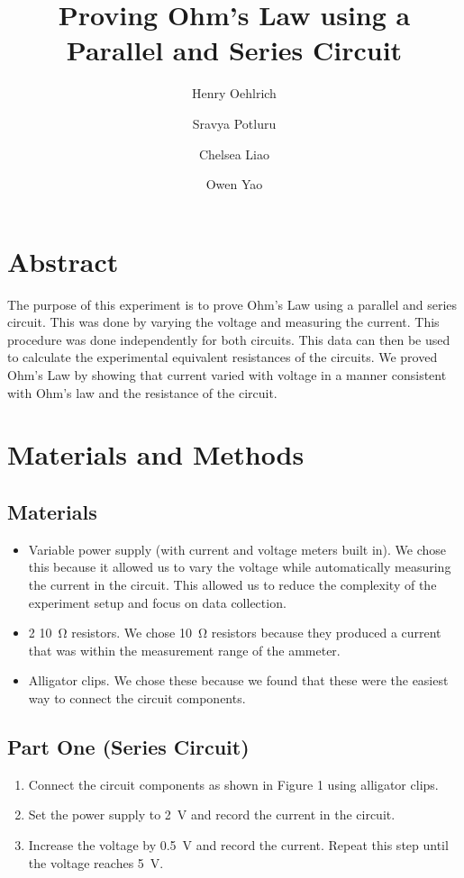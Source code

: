 \documentclass{article}
\title{Proving Ohm's Law using a Parallel and Series Circuit}
\author{Henry Oehlrich\and Sravya Potluru\and Chelsea Liao\and Owen Yao}
\begin{document}
\maketitle

\section{Abstract}

The purpose of this experiment is to prove Ohm's Law using a parallel and
series circuit. This was done by varying the voltage and measuring the current.
This procedure was done independently for both circuits. This data can then be
used to calculate the experimental equivalent resistances of the circuits. We
proved Ohm's Law by showing that current varied with voltage in a manner
consistent with Ohm's law and the resistance of the circuit.

\section{Materials and Methods}

\subsection{Materials}
\begin{itemize}
    \item Variable power supply (with current and voltage meters built in). We
        chose this because it allowed us to vary the voltage while
        automatically measuring the current in the circuit. This allowed us to
        reduce the complexity of the experiment setup and focus on data
        collection.
    \item 2 \SI{10}{\ohm} resistors. We chose \SI{10}{\ohm} resistors because
        they produced a current that was within the measurement range of the
        ammeter.
    \item Alligator clips. We chose these because we found that these were the
        easiest way to connect the circuit components.
\end{itemize}


\subsection{Part One (Series Circuit)}
\begin{enumerate}
    \item Connect the circuit components as shown in Figure 1 using
        alligator clips.
    \item Set the power supply to \SI{2}{\volt} and record the current in the
        circuit.
    \item Increase the voltage by \SI{0.5}{\volt} and record the current.
        Repeat this step until the voltage reaches \SI{5}{\volt}. 
\end{enumerate}
\end{document}

